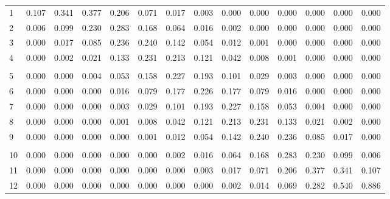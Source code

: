 \documentclass[
]{article}
\begin{document}
\begin{longtable}[t]{lrrrrrrrrrrrrr}
\hspace{1em}1 & 0.107 & 0.341 & 0.377 & 0.206 & 0.071 & 0.017 & 0.003 & 0.000 & 0.000 & 0.000 & 0.000 & 0.000 & 0.000\\
\hspace{1em}2 & 0.006 & 0.099 & 0.230 & 0.283 & 0.168 & 0.064 & 0.016 & 0.002 & 0.000 & 0.000 & 0.000 & 0.000 & 0.000\\
\hspace{1em}3 & 0.000 & 0.017 & 0.085 & 0.236 & 0.240 & 0.142 & 0.054 & 0.012 & 0.001 & 0.000 & 0.000 & 0.000 & 0.000\\
\hspace{1em}4 & 0.000 & 0.002 & 0.021 & 0.133 & 0.231 & 0.213 & 0.121 & 0.042 & 0.008 & 0.001 & 0.000 & 0.000 & 0.000\\
\addlinespace[-.7em]
\multicolumn{14}{l}{ }\\
\hspace{1em}5 & 0.000 & 0.000 & 0.004 & 0.053 & 0.158 & 0.227 & 0.193 & 0.101 & 0.029 & 0.003 & 0.000 & 0.000 & 0.000\\
\hspace{1em}6 & 0.000 & 0.000 & 0.000 & 0.016 & 0.079 & 0.177 & 0.226 & 0.177 & 0.079 & 0.016 & 0.000 & 0.000 & 0.000\\
\hspace{1em}7 & 0.000 & 0.000 & 0.000 & 0.003 & 0.029 & 0.101 & 0.193 & 0.227 & 0.158 & 0.053 & 0.004 & 0.000 & 0.000\\
\hspace{1em}8 & 0.000 & 0.000 & 0.000 & 0.001 & 0.008 & 0.042 & 0.121 & 0.213 & 0.231 & 0.133 & 0.021 & 0.002 & 0.000\\
\hspace{1em}9 & 0.000 & 0.000 & 0.000 & 0.000 & 0.001 & 0.012 & 0.054 & 0.142 & 0.240 & 0.236 & 0.085 & 0.017 & 0.000\\
\addlinespace[-.7em]
\multicolumn{14}{l}{ }\\
\hspace{1em}10 & 0.000 & 0.000 & 0.000 & 0.000 & 0.000 & 0.002 & 0.016 & 0.064 & 0.168 & 0.283 & 0.230 & 0.099 & 0.006\\
\hspace{1em}11 & 0.000 & 0.000 & 0.000 & 0.000 & 0.000 & 0.000 & 0.003 & 0.017 & 0.071 & 0.206 & 0.377 & 0.341 & 0.107\\
\hspace{1em}12 & 0.000 & 0.000 & 0.000 & 0.000 & 0.000 & 0.000 & 0.000 & 0.002 & 0.014 & 0.069 & 0.282 & 0.540 & 0.886\\
\bottomrule
\end{longtable}
\end{document}
